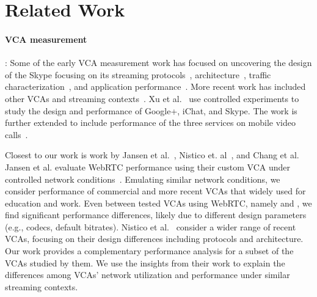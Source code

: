 \section{Related Work}\label{sec:related}

\paragraph{VCA measurement}: Some of the early VCA measurement work has focused on uncovering the design of the Skype focusing on its streaming protocols~\cite{baset2004analysis}, architecture~\cite{guha2005experimental}, traffic characterization~\cite{bonfiglio2008tracking}, and application performance~\cite{hossfeld2008analysis}. More recent work has included other VCAs and streaming contexts~\cite{xu2012video, yu2014can, azfar2016android}. Xu et al.~\cite{xu2012video} use controlled experiments to study the design and performance of Google+, iChat, and Skype. The work is further extended to include performance of the three services on mobile video calls~\cite{yu2014can}. 

Closest to our work is work by Jansen et al.~\cite{jansen2018performance}, Nistico et. al~\cite{nistico2020comparative}, and Chang et al. Jansen et al. evaluate WebRTC performance using their custom VCA under controlled network conditions~\cite{jansen2018performance}. Emulating similar network conditions, we consider performance of commercial and more recent VCAs that widely used for education and work. Even between tested VCAs using WebRTC, namely \meet and \teamsbrowser, we find significant performance differences, likely due to different design parameters (e.g., codecs, default bitrates). Nistico et al.~\cite{nistico2020comparative} consider a wider range of recent VCAs, focusing on their design differences including protocols and architecture. Our work provides a complementary performance analysis for a subset of the VCAs studied by them. We use the insights from their work to explain the differences among VCAs' network utilization and performance under similar streaming contexts. 

